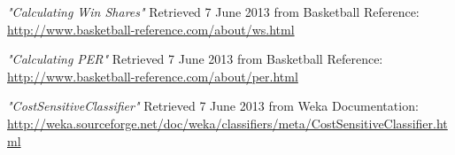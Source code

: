 \documentclass[paper=a4, fontsize=11pt]{scrartcl} %
\numberwithin{equation}{section} %
\numberwithin{figure}{section} %
\numberwithin{table}{section} %
\begin{document}
\begin{thebibliography}{9}
 \emph{"Calculating Win Shares"}
  Retrieved 7 June 2013 from Basketball Reference:
 \url{http://www.basketball-reference.com/about/ws.html}

 \emph{"Calculating PER"}
  Retrieved 7 June 2013 from Basketball Reference:
 \url{ http://www.basketball-reference.com/about/per.html}

\emph{"CostSensitiveClassifier"}
  Retrieved 7 June 2013 from Weka Documentation:
\url{http://weka.sourceforge.net/doc/weka/classifiers/meta/CostSensitiveClassifier.html}
 
\end{thebibliography}
\end{document}
